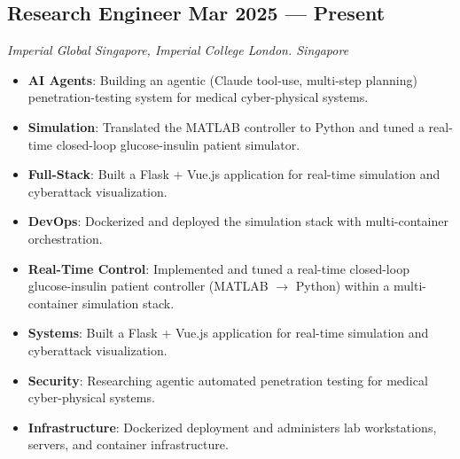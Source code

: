 \documentclass[a4paper,10pt]{article}
\newif\ifaimlver
\newif\ifallver
\newcommand{\subtextit}[1]{
\vspace{0cm} 
\textit{ #1 
\vspace{-0.1cm}} }
\newenvironment{zitemize}{
\vspace{0.06cm}
\begin{itemize}\itemsep 1pt \parskip 1pt \parsep 3pt}
{\end{itemize}\vspace{-0.32cm}}
\begin{document}
\subsection*{ \large Research Engineer \hfill Mar 2025 --- Present }
\subtextit{Imperial Global Singapore, Imperial College London. \hfill Singapore}
\begin{zitemize}
\ifallver
    \item \textbf{AI Agents}: Building an agentic (Claude tool-use, multi-step planning) penetration-testing system for medical cyber-physical systems.
    \item \textbf{Simulation}: Translated the MATLAB controller to Python and tuned a real-time closed-loop glucose-insulin patient simulator.
    \item \textbf{Full-Stack}: Built a Flask + Vue.js application for real-time simulation and cyberattack visualization.
    \item \textbf{DevOps}: Dockerized and deployed the simulation stack with multi-container orchestration.
    \item \textbf{Infrastructure}: Administers lab workstations, servers, and container infrastructure.
\else\ifaimlver
    \item \textbf{AI Agents}: Building an agentic (Claude tool-use, multi-step planning) penetration-testing system for medical cyber-physical systems.
    \item \textbf{Simulation}: Translated the MATLAB controller to Python and tuned a real-time closed-loop glucose-insulin patient simulator.
    \item \textbf{Full-Stack}: Built a Flask + Vue.js application for real-time simulation and cyberattack visualization.
    \item \textbf{DevOps}: Dockerized and deployed the simulation stack with multi-container orchestration.
\else
    \item \textbf{Real-Time Control}: Implemented and tuned a real-time closed-loop glucose-insulin patient controller (MATLAB $\rightarrow$ Python) within a multi-container simulation stack.
    \item \textbf{Systems}: Built a Flask + Vue.js application for real-time simulation and cyberattack visualization.
    \item \textbf{Security}: Researching agentic automated penetration testing for medical cyber-physical systems.
    \item \textbf{Infrastructure}: Dockerized deployment and administers lab workstations, servers, and container infrastructure.
\fi\fi
\end{zitemize}
\end{document}
